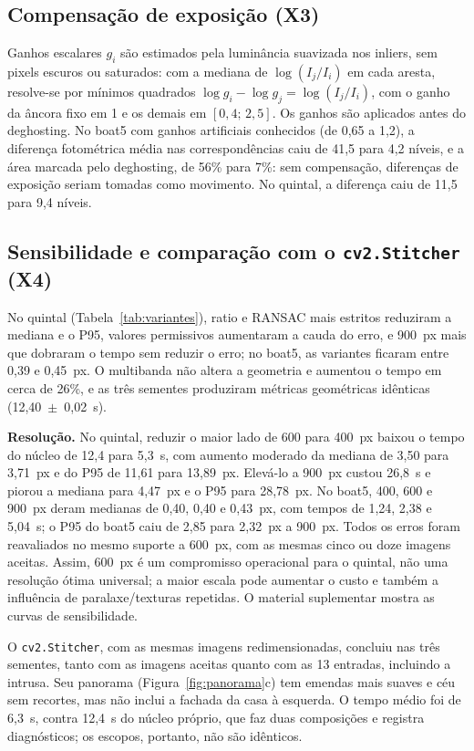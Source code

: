 \documentclass[10pt,a4paper]{article}
\begin{document}
\subsection{Compensação de exposição (X3)}
Ganhos escalares $g_i$ são estimados pela luminância suavizada nos inliers, sem pixels escuros ou
saturados: com a mediana de $\log(I_j/I_i)$ em cada aresta, resolve-se por mínimos quadrados
$\log g_i - \log g_j = \log(I_j/I_i)$, com o ganho da âncora fixo em 1 e os demais em $[0{,}4;\,2{,}5]$. Os
ganhos são aplicados antes do deghosting. No boat5 com ganhos artificiais conhecidos (de 0,65 a 1,2), a
diferença fotométrica média nas correspondências caiu de 41,5 para 4,2 níveis, e a área marcada pelo
deghosting, de 56\% para 7\%: sem compensação, diferenças de exposição seriam tomadas como movimento. No
quintal, a diferença caiu de 11,5 para 9,4 níveis.

\subsection{Sensibilidade e comparação com o \texttt{cv2.Stitcher} (X4)}
No quintal (Tabela~\ref{tab:variantes}), ratio e RANSAC mais estritos reduziram a mediana e o P95, valores
permissivos aumentaram a cauda do erro, e 900~px mais que dobraram o tempo sem reduzir o erro; no boat5, as
variantes ficaram entre 0,39 e 0,45~px. O multibanda não altera a geometria e aumentou o tempo em cerca de
26\%, e as três sementes produziram métricas geométricas idênticas (12,40~$\pm$~0,02~s).

\textbf{Resolução.} No quintal, reduzir o maior lado de 600 para 400~px baixou o tempo do núcleo de 12,4
para 5,3~s, com aumento moderado da mediana de 3,50 para 3,71~px e do P95 de 11,61 para 13,89~px.
Elevá-lo a 900~px custou 26,8~s e piorou a mediana para 4,47~px e o P95 para 28,78~px. No boat5, 400,
600 e 900~px deram medianas de 0,40, 0,40 e 0,43~px, com tempos de 1,24, 2,38 e 5,04~s; o P95 do
boat5 caiu de 2,85 para 2,32~px a 900~px. Todos os erros foram reavaliados no mesmo suporte a 600~px,
com as mesmas cinco ou doze imagens aceitas. Assim, 600~px é um compromisso operacional para o quintal,
não uma resolução ótima universal; a maior escala pode aumentar o custo e também a influência de
paralaxe/texturas repetidas. O material suplementar mostra as curvas de sensibilidade.

O \texttt{cv2.Stitcher}, com as mesmas imagens redimensionadas, concluiu nas três sementes, tanto com as
imagens aceitas quanto com as 13 entradas, incluindo a intrusa. Seu panorama
(Figura~\ref{fig:panorama}c) tem emendas mais suaves e céu sem recortes, mas não inclui a fachada da casa à
esquerda. O tempo médio foi de 6,3~s, contra 12,4~s do núcleo próprio, que faz duas composições e registra
diagnósticos; os escopos, portanto, não são idênticos.
\end{document}

